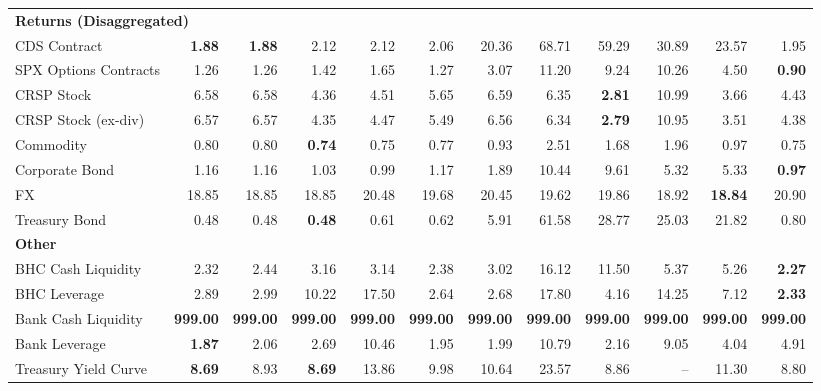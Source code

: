 \begin{table}[htbp]
\begin{tabular}{@{}lrrrrrrrrrrr@{}}
\midrule
\multicolumn{12}{l}{\textbf{Returns (Disaggregated)}} \\
CDS Contract & \textbf{1.88} & \textbf{1.88} & 2.12 & 2.12 & 2.06 & 20.36 & 68.71 & 59.29 & 30.89 & 23.57 & 1.95 \\
SPX Options Contracts & 1.26 & 1.26 & 1.42 & 1.65 & 1.27 & 3.07 & 11.20 & 9.24 & 10.26 & 4.50 & \textbf{0.90} \\
CRSP Stock & 6.58 & 6.58 & 4.36 & 4.51 & 5.65 & 6.59 & 6.35 & \textbf{2.81} & 10.99 & 3.66 & 4.43 \\
CRSP Stock (ex-div) & 6.57 & 6.57 & 4.35 & 4.47 & 5.49 & 6.56 & 6.34 & \textbf{2.79} & 10.95 & 3.51 & 4.38 \\
Commodity & 0.80 & 0.80 & \textbf{0.74} & 0.75 & 0.77 & 0.93 & 2.51 & 1.68 & 1.96 & 0.97 & 0.75 \\
Corporate Bond & 1.16 & 1.16 & 1.03 & 0.99 & 1.17 & 1.89 & 10.44 & 9.61 & 5.32 & 5.33 & \textbf{0.97} \\
FX & 18.85 & 18.85 & 18.85 & 20.48 & 19.68 & 20.45 & 19.62 & 19.86 & 18.92 & \textbf{18.84} & 20.90 \\
Treasury Bond & 0.48 & 0.48 & \textbf{0.48} & 0.61 & 0.62 & 5.91 & 61.58 & 28.77 & 25.03 & 21.82 & 0.80 \\
\midrule
\multicolumn{12}{l}{\textbf{Other}} \\
BHC Cash Liquidity & 2.32 & 2.44 & 3.16 & 3.14 & 2.38 & 3.02 & 16.12 & 11.50 & 5.37 & 5.26 & \textbf{2.27} \\
BHC Leverage & 2.89 & 2.99 & 10.22 & 17.50 & 2.64 & 2.68 & 17.80 & 4.16 & 14.25 & 7.12 & \textbf{2.33} \\
Bank Cash Liquidity & \textbf{999.00} & \textbf{999.00} & \textbf{999.00} & \textbf{999.00} & \textbf{999.00} & \textbf{999.00} & \textbf{999.00} & \textbf{999.00} & \textbf{999.00} & \textbf{999.00} & \textbf{999.00} \\
Bank Leverage & \textbf{1.87} & 2.06 & 2.69 & 10.46 & 1.95 & 1.99 & 10.79 & 2.16 & 9.05 & 4.04 & 4.91 \\
Treasury Yield Curve & \textbf{8.69} & 8.93 & \textbf{8.69} & 13.86 & 9.98 & 10.64 & 23.57 & 8.86 & -- & 11.30 & 8.80 \\
\bottomrule
\end{tabular}
\vspace{0.1cm}

\end{table}
